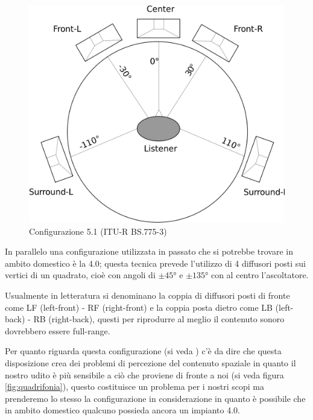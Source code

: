 \documentclass[12pt,a4paper]{report}
\begin{document}
\begin{figure}[htbp]
	\centering
	\includegraphics[scale=0.18]{figures/5-1.png}
	\caption {Configurazione 5.1 (ITU-R BS.775-3)}
	\label{fig:5.1}
	\end{figure}

In parallelo una configurazione utilizzata in passato che si potrebbe trovare in ambito domestico è la 4.0; questa tecnica prevede l'utilizzo di 4 diffusori posti sui vertici di un quadrato, cioè con angoli di $\pm45°$ e $\pm135°$ con al centro l'ascoltatore.

Usualmente in letteratura si denominano la coppia di diffusori posti di fronte come LF (left-front) - RF (right-front) e la coppia posta dietro come LB (left-back) - RB (right-back), questi per riprodurre al meglio il contenuto sonoro dovrebbero essere full-range.

Per quanto riguarda questa configurazione (si veda \cite{surround}) c'è da dire che questa disposizione crea dei problemi di percezione del contenuto spaziale in quanto il nostro udito è più sensibile a ciò che proviene di fronte a noi (si veda figura \ref{fig:quadrifonia}), questo costituisce un problema per i nostri scopi ma prenderemo lo stesso la configurazione in considerazione in quanto è possibile che in ambito domestico qualcuno possieda ancora un impianto 4.0.
\end{document}
